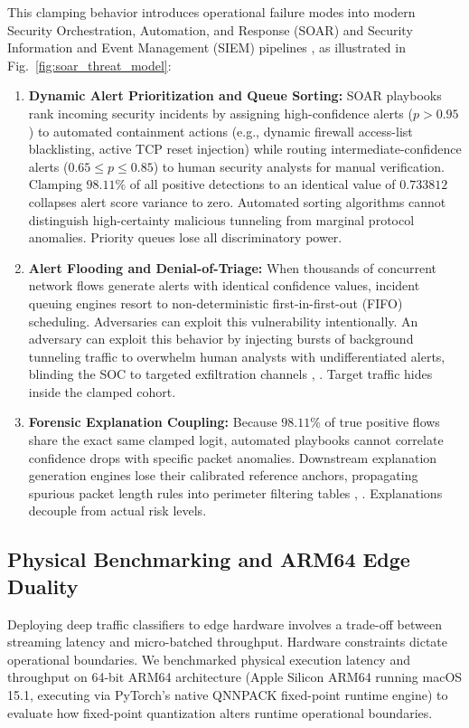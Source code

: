 \documentclass[conference]{IEEEtran}
\begin{document}
This clamping behavior introduces operational failure modes into modern Security Orchestration, Automation, and Response (SOAR) and Security Information and Event Management (SIEM) pipelines \cite{b27}, as illustrated in Fig.~\ref{fig:soar_threat_model}:
\begin{enumerate}
    \item \textbf{Dynamic Alert Prioritization and Queue Sorting:} SOAR playbooks rank incoming security incidents by assigning high-confidence alerts ($p > 0.95$) to automated containment actions (e.g., dynamic firewall access-list blacklisting, active TCP reset injection) while routing intermediate-confidence alerts ($0.65 \le p \le 0.85$) to human security analysts for manual verification. Clamping $98.11\%$ of all positive detections to an identical value of $0.733812$ collapses alert score variance to zero. Automated sorting algorithms cannot distinguish high-certainty malicious tunneling from marginal protocol anomalies. Priority queues lose all discriminatory power.
    \item \textbf{Alert Flooding and Denial-of-Triage:} When thousands of concurrent network flows generate alerts with identical confidence values, incident queuing engines resort to non-deterministic first-in-first-out (FIFO) scheduling. Adversaries can exploit this vulnerability intentionally. An adversary can exploit this behavior by injecting bursts of background tunneling traffic to overwhelm human analysts with undifferentiated alerts, blinding the SOC to targeted exfiltration channels \cite{b28}, \cite{b25}. Target traffic hides inside the clamped cohort.
    \item \textbf{Forensic Explanation Coupling:} Because $98.11\%$ of true positive flows share the exact same clamped logit, automated playbooks cannot correlate confidence drops with specific packet anomalies. Downstream explanation generation engines lose their calibrated reference anchors, propagating spurious packet length rules into perimeter filtering tables \cite{b29}, \cite{b26}. Explanations decouple from actual risk levels.
\end{enumerate}

\subsection{Physical Benchmarking and ARM64 Edge Duality}
Deploying deep traffic classifiers to edge hardware involves a trade-off between streaming latency and micro-batched throughput. Hardware constraints dictate operational boundaries. We benchmarked physical execution latency and throughput on 64-bit ARM64 architecture (Apple Silicon ARM64 running macOS 15.1, executing via PyTorch's native QNNPACK fixed-point runtime engine) to evaluate how fixed-point quantization alters runtime operational boundaries.
\end{document}
